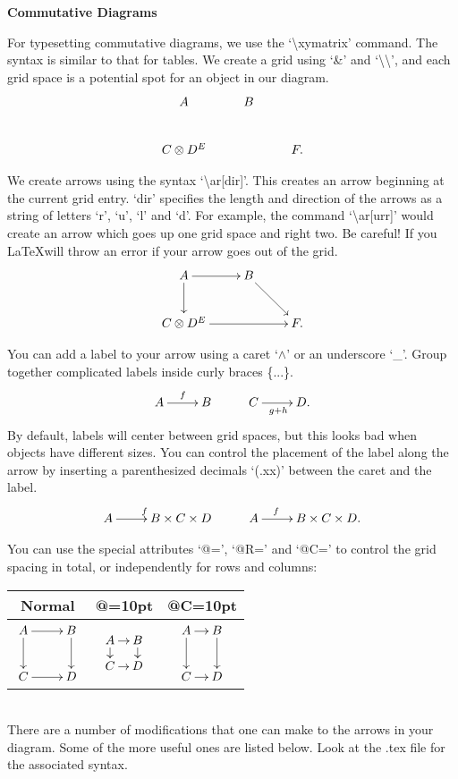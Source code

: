 \documentclass[letterpaper,10pt]{article}
\newcommand{\<}{\langle}
\renewcommand{\>}{\rangle}
\newcommand{\bsl}{\textbackslash}
\begin{document}
\Large \textbf{Commutative Diagrams} \normalsize

For typesetting commutative diagrams, we use the `\bsl xymatrix' command. The syntax is similar to that for tables. We create a grid using `\&' and `\bsl\bsl', and each grid space is a potential spot for an object in our diagram.
$$\xymatrix{
A & B &    \\
C\otimes D^E &   & F. \\
}$$

We create arrows using the syntax `\bsl ar[dir]'. This creates an arrow beginning at the current grid entry. `dir' specifies the length and direction of the arrows as a string of letters `r', `u', `l' and `d'. For example, the command `\bsl ar[urr]' would create an arrow which goes up one grid space and right two. Be careful! If you \LaTeX will throw an error if your arrow goes out of the grid.
$$\xymatrix{
A \ar[r] \ar[d] & B \ar[rd] \\
C\otimes D^E \ar[rr]       &           & F. \\
}$$

You can add a label to your arrow using a caret `$\wedge$' or an underscore `\_'. Group together complicated labels inside curly braces \{...\}.
$$\xymatrix{ A \ar[r]^f & B & C \ar[r]_{g+h} & D.}$$
By default, labels will center between grid spaces, but this looks bad when objects have different sizes. You can control the placement of the label along the arrow by inserting a parenthesized decimals `(.xx)' between the caret and the label. 
$$\xymatrix{A \ar[r]^{f} & B\times C\times D & A \ar[r]^(.3){f} & B\times C\times D.}$$

You can use the special attributes `@=', `@R=' and `@C=' to control the grid spacing in total, or independently for rows and columns:

\begin{tabular}{|c|c|c|}
Normal&@=10pt&@C=10pt\\\hline
$\xymatrix{ A \ar[r] \ar[d] & B \ar[d]\\ C \ar[r] & D}$ &$\xymatrix@=8pt{ A \ar[r] \ar[d] & B \ar[d]\\ C \ar[r] & D}$ & $\xymatrix@C=10pt{ A \ar[r] \ar[d] & B \ar[d]\\ C \ar[r] & D}$\\
\end{tabular}\\


There are a number of modifications that one can make to the arrows in your diagram. Some of the more useful ones are listed below. Look at the .tex file for the associated syntax.
\end{document}
